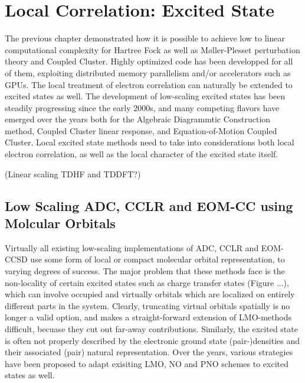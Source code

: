\chapter{Local Correlation: Excited State}

The previous chapter demonstrated how it is possible to achieve low to linear computational complexity for Hartree Fock as well as M{\o}ller-Plesset perturbation theory and Coupled Cluster. Highly optimized code has been developped for all of them, exploiting distributed memory parallelism and/or accelerators such as GPUs. The local treatment of electron correlation can naturally be extended to excited states as well. The development of low-scaling excited states has been steadily progressing since the early 2000s, and many competing flavors have emerged over the years both for the Algebraic Diagrammtic Construction method, Coupled Cluster linear response, and Equation-of-Motion Coupled Cluster. Local excited state methods need to take into considerations both local electron correlation, as well as the local character of the excited state itself.


(Linear scaling TDHF and TDDFT?)

\section{Low Scaling ADC, CCLR and EOM-CC using Molcular Orbitals}

Virtually all existing low-scaling implementations of ADC, CCLR and EOM-CCSD use some form of local or compact molecular orbital representation, to varying degrees of success. The major problem that these methods face is the non-locality of certain excited states such as charge transfer states (Figure ...), which can involve occupied and virtually orbitals which are localized on entirely different parts in the system. Clearly, truncating virtual orbitals spatially is no longer a valid option, and makes a straight-forward extension of LMO-methods difficult, becuase they cut out far-away contributions. Similarly, the excited state is often not properly described by the electronic ground state (pair-)densities and their associated (pair) natural representation. Over the years, various strategies have been proposed to adapt exisiting LMO, NO and PNO schemes to excited states as well. 

